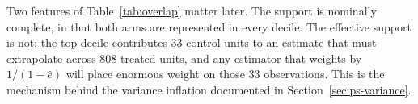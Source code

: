 Two features of Table~\ref{tab:overlap} matter later. The support is nominally
complete, in that both arms are represented in every decile. The effective
support is not: the top decile contributes 33 control units to an estimate that
must extrapolate across 808 treated units, and any estimator that weights by
$1/(1 - \hat{e})$ will place enormous weight on those 33 observations. This is
the mechanism behind the variance inflation documented in
Section~\ref{sec:ps-variance}.
